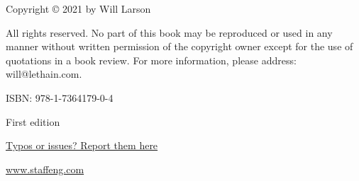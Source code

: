 \newpage

Copyright © 2021 by Will Larson

All rights reserved. No part of this book may be reproduced or used in any manner without written permission of the copyright owner except for the use of quotations in a book review. For more information, please address: will@lethain.com.

ISBN: 978-1-7364179-0-4

First edition

\href{https://airtable.com/shr416F1GqPYr1KqE}{Typos or issues? Report them here}

\href{https://www.staffeng.com}{www.staffeng.com}

\newpage

